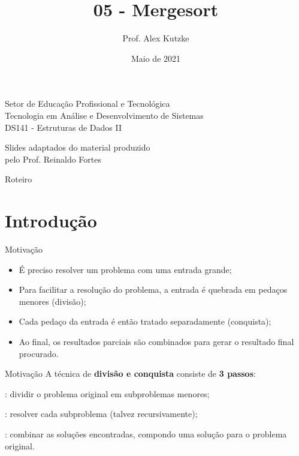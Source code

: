 \documentclass{beamer}
\title{05 - Mergesort}
\author{Prof. Alex Kutzke}
\date{Maio de 2021}
\begin{document}
	\begin{frame}
		\begin{center}
			\large{Setor de Educação Profissional e Tecnológica}\\
			Tecnologia em Análise e Desenvolvimento de Sistemas\\
			\vspace{1cm}			
			\small{DS141 - Estruturas de Dados II}
		\end{center}
		\titlepage
		\begin{center}
			Slides adaptados do material produzido\\pelo Prof. Reinaldo Fortes
		\end{center}
	\end{frame}

	\begin{frame}[c]{Roteiro}
		\tableofcontents

	\end{frame}

	\section{Introdução}

	\begin{frame}[c]{Motivação}
		\begin{itemize}
			\item É preciso resolver um problema com uma entrada grande;
			\item Para facilitar a resolução do problema, a entrada é quebrada em pedaços menores (divisão);
			\item Cada pedaço da entrada é então tratado separadamente (conquista);
			\item Ao final, os resultados parciais são combinados para gerar o resultado final procurado.
		\end{itemize}
	\end{frame}

	\begin{frame}[c]{Motivação}
		A técnica de \textbf{divisão e conquista} consiste de \textbf{3 passos}:
		\begin{description}
			\justifying
			\item[Divisão]: dividir o problema original em subproblemas menores;
			\item[Conquista]: resolver cada subproblema (talvez recursivamente);
			\item[Combinação]: combinar as soluções encontradas, compondo uma solução para o problema original.
		\end{description}
	\end{frame}
\end{document}
